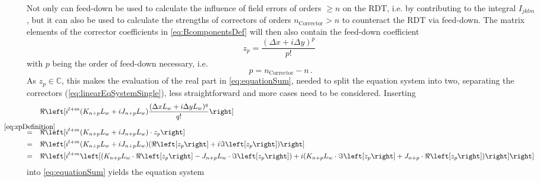 Not only can feed-down be used to calculate the influence of field errors of orders $\geq n$ on the RDT, 
i.e. by contributing to the integral $I_{jklm}$, but it can also be used to calculate the strengths 
of correctors of orders $n_\text{Corrector} > n$ to counteract the RDT via feed-down.
The matrix elements of the corrector coefficients in \cref{eq:BcomponentsDef} will then also contain the feed-down coefficient
%
\begin{equation}
    \label{eq:zpDefinition}
    z_{p} = \frac{\left( \Delta x + i\Delta y\right)^p}{p!} \, \,
\end{equation}
%
with $p$ being the order of feed-down necessary, i.e. 
\begin{equation}
    \label{eq:DiffOrderCorrectorRDT}
    p = n_\text{Corrector} - n \, .
\end{equation}
%
As $z_p \in \mathbb{C}$, this makes the evaluation of the real part in \cref{eq:equationSum}, 
needed to split the equation system into two, separating the correctors (\cref{eq:linearEqSystemSingle}), 
less straightforward and more cases need to be considered.
Inserting
%
\begin{equation}
    \label{eq:KnJnWithZp}
    \begin{split}
        &\ReOf{    
        i^{l+m}
        (K_{n+p}L_w + iJ_{n+p}L_w) \frac{(\Delta xL_w + i \Delta yL_w)^q}{q!} 
        }
        \\
        \overeq{\cref{eq:zpDefinition}} \quad
        &\ReOf{    
        i^{l+m}
        (K_{n+p}L_w + iJ_{n+p}L_w) \cdot z_p 
        }
        \\
        =  \quad
        &\ReOf{    
        i^{l+m}
        (K_{n+p}L_w + iJ_{n+p}L_w) (\ReOf{z_p} + i\ImOf{z_p}) 
        }
        \\
        =  \quad
        &\ReOf{    
        i^{l+m} \left[
        (K_{n+p}L_w \cdot \ReOf{z_p} -J_{n+p}L_w \cdot \ImOf{z_p}) + i(K_{n+p}L_w \cdot \ImOf{z_p} + J_{n+p} \cdot \ReOf{z_p} )\right] 
        }
    \end{split}
\end{equation}
%
into \cref{eq:equationSum} yields the equation system
%
